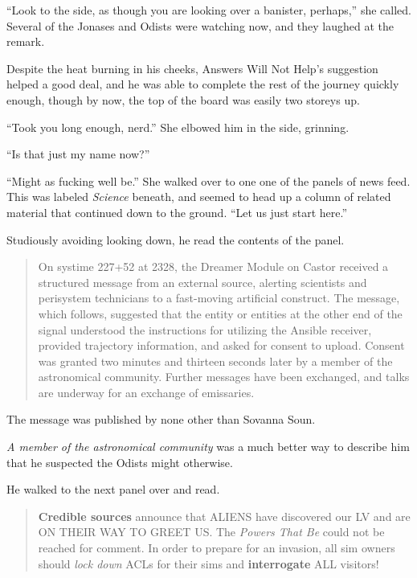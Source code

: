 ``Look to the side, as though you are looking over a banister, perhaps,'' she called. Several of the Jonases and Odists were watching now, and they laughed at the remark.

Despite the heat burning in his cheeks, Answers Will Not Help's suggestion helped a good deal, and he was able to complete the rest of the journey quickly enough, though by now, the top of the board was easily two storeys up.

``Took you long enough, nerd.'' She elbowed him in the side, grinning.

``Is that just my name now?''

``Might as fucking well be.'' She walked over to one one of the panels of news feed. This was labeled \emph{Science} beneath, and seemed to head up a column of related material that continued down to the ground. ``Let us just start here.''

Studiously avoiding looking down, he read the contents of the panel.

\begin{quote}
On systime 227+52 at 2328, the Dreamer Module on Castor received a structured message from an external source, alerting scientists and perisystem technicians to a fast-moving artificial construct. The message, which follows, suggested that the entity or entities at the other end of the signal understood the instructions for utilizing the Ansible receiver, provided trajectory information, and asked for consent to upload. Consent was granted two minutes and thirteen seconds later by a member of the astronomical community. Further messages have been exchanged, and talks are underway for an exchange of emissaries.
\end{quote}

The message was published by none other than Sovanna Soun.

\emph{A member of the astronomical community} was a much better way to describe him that he suspected the Odists might otherwise.

He walked to the next panel over and read.

\begin{quote}
\textbf{Credible sources} announce that ALIENS have discovered our LV and are ON THEIR WAY TO GREET US. The \emph{Powers That Be} could not be reached for comment. In order to prepare for an invasion, all sim owners should \emph{lock down} ACLs for their sims and \textbf{interrogate} ALL visitors!
\end{quote}

